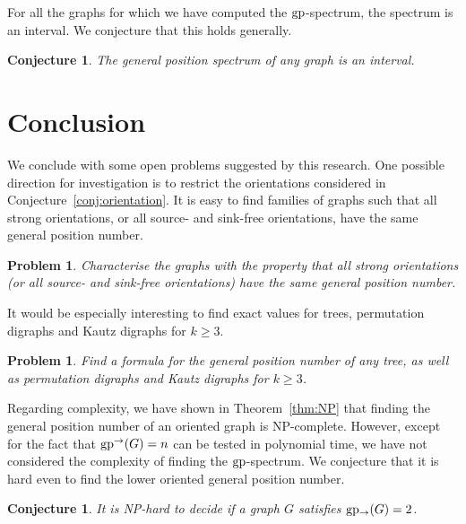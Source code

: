 \documentclass[a4paper,12pt]{article}
\newtheorem{conjecture}[theorem]{Conjecture}
\newtheorem{problem}[theorem]{Problem}
\theoremstyle{definition}
\newcommand{\gp}{{\rm gp}}
\newcommand{\ugp}{{\rm gp^{\rightarrow }}}
\newcommand{\lgp}{{\rm gp_{\rightarrow }}}
\begin{document}
	
	
	
	For all the graphs for which we have computed the $\gp $-spectrum, the spectrum is an interval. We conjecture that this holds generally.
	
	\begin{conjecture}
		The general position spectrum of any graph is an interval.
	\end{conjecture}
	
	
	
	
	
	
	
	
	
	
	
	\section{Conclusion}\label{sec:conclusion}
	
	We conclude with some open problems suggested by this research. One possible direction for investigation is to restrict the orientations considered in Conjecture~\ref{conj:orientation}. It is easy to find families of graphs such that all strong orientations, or all source- and sink-free orientations, have the same general position number. 
	
	\begin{problem}
		Characterise the graphs with the property that all strong orientations (or all source- and sink-free orientations) have the same general position number. 
	\end{problem}
	
	It would be especially interesting to find exact values for trees, permutation digraphs and Kautz digraphs for $k \geq 3$.
	
	\begin{problem}
		Find a formula for the general position number of any tree, as well as permutation digraphs and Kautz digraphs for $k \geq 3$.
	\end{problem}
	
	Regarding complexity, we have shown in Theorem~\ref{thm:NP} that finding the general position number of an oriented graph is NP-complete. However, except for the fact that $\ugp (G) = n$ can be tested in polynomial time, we have not considered the complexity of finding the $\gp $-spectrum. We conjecture that it is hard even to find the lower oriented general position number. 
	
	\begin{conjecture}
		It is NP-hard to decide if a graph $G$ satisfies $\lgp (G) = 2$.
	\end{conjecture}
	
\end{document}
